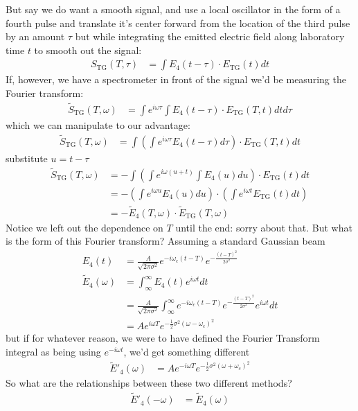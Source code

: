 But say we do want a smooth signal, and  use a local oscillator in the form of a fourth pulse and translate it's center forward from the location of the third pulse by an amount $\tau$ but while integrating the emitted electric field along laboratory time $t$ to smooth out the signal:
\begin{align}
	S_{\text{TG}} (T, \tau) &=  \int  E_4 (t - \tau) \cdot E_{\text{TG}} (t) dt
\end{align}
If, however, we have a spectrometer in front of the signal we'd be measuring the Fourier transform:
\begin{align}
	\tilde{S}_{\text{TG}} (T, \omega) &= \int e^{i \omega \tau} \int  E_4 (t - \tau) \cdot E_{\text{TG}} (T, t) dt d\tau
\end{align}
which we can manipulate to our advantage:
\begin{align}
	\tilde{S}_{\text{TG}} (T, \omega) &=\int \left( \int e^{i \omega \tau}   E_4 (t - \tau) d\tau \right) \cdot E_{\text{TG}} (T, t) dt
\end{align}
substitute $u = t - \tau$
\begin{align}
	\tilde{S}_{\text{TG}} (T, \omega) &=-\int \left( \int e^{i \omega \left(u + t\right)} \int  E_4 (u) du \right) \cdot E_{\text{TG}} (t) dt  \\
	 &= -\left( \int e^{i \omega u}   E_4 (u) du \right) \cdot  \left( \int e^{i \omega  t}  E_{\text{TG}} (t) dt \right) \\
	&=  -\tilde{E}_4 (T, \omega) \cdot \tilde{E}_{\text{TG}} (T, \omega)
\end{align}
Notice we left out the dependence on $T$ until the end: sorry about that.  But what is the form of this Fourier transform?  Assuming a standard Gaussian beam
\begin{align}
	 E_4 (t ) &= \frac{A}{\sqrt{2 \pi \sigma^2}} e^{-i \omega_c (t - T)}e^{-\frac{(t-T)^2}{2 \sigma^2}} \\
	\tilde{E}_4 (\omega) &=\int_{\infty}^{\infty}  E_4 (t ) e^{ i \omega t} dt \\
	 &=  \frac{A}{\sqrt{2 \pi \sigma^2}} \int_{\infty}^{\infty}  e^{-i \omega_c (t - T)}e^{-\frac{(t-T)^2}{2 \sigma^2}} e^{ i \omega t} dt \\
	 &= A e^{i \omega T} e^{-\frac{1}{2} \sigma^2 (\omega - \omega_c)^2}
\end{align}
but if for whatever reason, we were to have defined the Fourier Transform integral as being using $e^{-i \omega t}$, we'd get something different
\begin{align}
	 \tilde{E}'_4 (\omega) &= A e^{-i \omega T} e^{-\frac{1}{2} \sigma^2 (\omega + \omega_c)^2}
\end{align}
So what are the relationships between these two different methods?
\begin{align}
	\tilde{E}'_4 (-\omega) &= \tilde{E}_4 (\omega)
\end{align}

